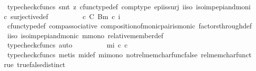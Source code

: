 \begin{isabellebody}
\ {\isacharparenleft}{\kern0pt}typecheck{\isacharunderscore}{\kern0pt}cfuncs{\isacharcomma}{\kern0pt}\ smt\ {\isacharparenleft}{\kern0pt}z{}{\isacharparenright}{\kern0pt}\ cfunc{\isacharunderscore}{\kern0pt}type{\isacharunderscore}{\kern0pt}def\ comp{\isacharunderscore}{\kern0pt}type\ epi{\isacharunderscore}{\kern0pt}is{\isacharunderscore}{\kern0pt}surj\ i{\isacharunderscore}{\kern0pt}iso\ iso{\isacharunderscore}{\kern0pt}imp{\isacharunderscore}{\kern0pt}epi{\isacharunderscore}{\kern0pt}and{\isacharunderscore}{\kern0pt}monic\ surjective{\isacharunderscore}{\kern0pt}def{\isacharparenright}{\kern0pt}\isanewline
\ \ \ \ \isamarkupfalse%
\ \isamarkupfalse%
\ {\isachardoublequoteopen}{\isachardot}{\kern0pt}{\isachardot}{\kern0pt}{\isachardot}{\kern0pt}\ {\isacharequal}{\kern0pt}\ {\isacharparenleft}{\kern0pt}c\ {\isasymin}\isactrlbsub C\isactrlesub \ {\isacharparenleft}{\kern0pt}B{\isacharcomma}{\kern0pt}m\ {\isasymcirc}\isactrlsub c\ i{\isacharparenright}{\kern0pt}{\isacharparenright}{\kern0pt}{\isachardoublequoteclose}\isanewline
\ \ \ \ \ \ \isamarkupfalse%
\ cfunc{\isacharunderscore}{\kern0pt}type{\isacharunderscore}{\kern0pt}def\ comp{\isacharunderscore}{\kern0pt}associative{}\ composition{\isacharunderscore}{\kern0pt}of{\isacharunderscore}{\kern0pt}monic{\isacharunderscore}{\kern0pt}pair{\isacharunderscore}{\kern0pt}is{\isacharunderscore}{\kern0pt}monic\ factors{\isacharunderscore}{\kern0pt}through{\isacharunderscore}{\kern0pt}def{}\ i{\isacharunderscore}{\kern0pt}iso\ iso{\isacharunderscore}{\kern0pt}imp{\isacharunderscore}{\kern0pt}epi{\isacharunderscore}{\kern0pt}and{\isacharunderscore}{\kern0pt}monic\ m{\isacharunderscore}{\kern0pt}mono\ relative{\isacharunderscore}{\kern0pt}member{\isacharunderscore}{\kern0pt}def{}\isanewline
\ \ \ \ \ \ \isamarkupfalse%
\ {\isacharparenleft}{\kern0pt}typecheck{\isacharunderscore}{\kern0pt}cfuncs{\isacharcomma}{\kern0pt}\ auto{\isacharparenright}{\kern0pt}\isanewline
\ \ \ \ \isamarkupfalse%
\ \isamarkupfalse%
\ {\isachardoublequoteopen}{\isachardot}{\kern0pt}{\isachardot}{\kern0pt}{\isachardot}{\kern0pt}\ {\isacharequal}{\kern0pt}\ {\isacharparenleft}{\kern0pt}{\isasymchi}mi\ {\isasymcirc}\isactrlsub c\ c\ {\isacharequal}{\kern0pt}\ {\isasymt}{\isacharparenright}{\kern0pt}{\isachardoublequoteclose}\isanewline
\ \ \ \ \ \ \isamarkupfalse%
\ {\isacharparenleft}{\kern0pt}typecheck{\isacharunderscore}{\kern0pt}cfuncs{\isacharcomma}{\kern0pt}\ metis\ {\isasymchi}mi{\isacharunderscore}{\kern0pt}def\ mi{\isacharunderscore}{\kern0pt}mono\ not{\isacharunderscore}{\kern0pt}rel{\isacharunderscore}{\kern0pt}mem{\isacharunderscore}{\kern0pt}char{\isacharunderscore}{\kern0pt}func{\isacharunderscore}{\kern0pt}false\ rel{\isacharunderscore}{\kern0pt}mem{\isacharunderscore}{\kern0pt}char{\isacharunderscore}{\kern0pt}func{\isacharunderscore}{\kern0pt}true\ true{\isacharunderscore}{\kern0pt}false{\isacharunderscore}{\kern0pt}distinct{\isacharparenright}{\kern0pt}\isanewline

\end{isabellebody}
